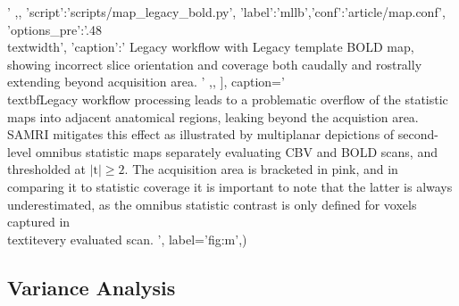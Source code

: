 {{                                '
			,},
		{'script':'scripts/map_legacy_bold.py', 'label':'mllb','conf':'article/map.conf', 'options_pre':'{.48\\textwidth}',
			'caption':'
				Legacy workflow with Legacy template BOLD map, showing incorrect slice orientation and coverage both caudally and rostrally extending beyond acquisition area.
			        '
                        ,},
		],
	caption='
                \\textbf{Legacy workflow processing leads to a problematic overflow of the statistic maps into adjacent anatomical regions, leaking beyond the acquistion area.}
                SAMRI mitigates this effect as illustrated by multiplanar depictions of second-level omnibus statistic maps separately evaluating CBV and BOLD scans, and thresholded at $\mathrm{|t|\geq2}$.
                The acquisition area is bracketed in pink, and in comparing it to statistic coverage it is important to note that the latter is always underestimated, as the omnibus statistic contrast is only defined for voxels captured in \\textit{every} evaluated scan.
                ',
	label='fig:m',)}

\subsection{Variance Analysis}

\begin{sansmath}
\end{sansmath}

